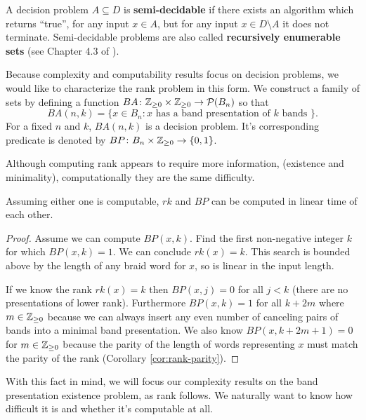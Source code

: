 \documentclass[12pt]{thesis}
\begin{document}
\begin{definition}
    A decision problem $A \subseteq D$ is \textbf{semi-decidable} if there exists an algorithm
    which returns ``true'', for any input $x \in A$,
    but for any input $x \in D \setminus A$ it does not terminate.
    Semi-decidable problems are also called \textbf{recursively enumerable sets}
    (see Chapter 4.3 of \cite{logical-foundations-of-math}).
\end{definition}

Because complexity and computability results focus on decision problems,
we would like to characterize the rank problem in this form.
We construct a family of sets 
by defining a function
$BA \colon \mathbb{Z}_{\geq 0} \times \mathbb{Z}_{\geq 0} \rightarrow \mathcal{P}(B_{n})$ 
so that 
\begin{equation} 
    BA(n, k) = \{ x \in B_{n} \colon x \text{ has a band presentation of $k$ bands } \}.
\end{equation}
For a fixed $n$ and $k$,  $BA(n, k)$ is a decision problem.
It's corresponding predicate is denoted by $BP \colon B_{n} \times \mathbb{Z}_{\geq 0} \rightarrow \{ 0, 1 \}$.


Although computing rank appears to require more information,
(existence and minimality), computationally they are the same difficulty.
\begin{proposition}
    Assuming either one is computable, $rk$ and $BP$ can be computed in linear time of each other.
\end{proposition}
\begin{proof}
    Assume we can compute $BP(x, k)$.
    Find the first non-negative integer $k$ for which $BP(x, k) = 1$.
    We can conclude $rk(x) = k$.
    This search is bounded above by the length of any braid word for $x$, so is linear in the input length.

    If we know the rank $rk(x) = k$
    then $BP(x, j) = 0$ for all $j < k$ (there are no presentations of lower rank).
    Furthermore $BP(x, k) = 1$ for all $k + 2m$ where $m \in \mathbb{Z}_{\geq 0}$
    because we can always insert any even number of canceling pairs of bands into 
    a minimal band presentation.
    We also know $BP(x, k + 2m + 1) = 0$ for $m \in \mathbb{Z}_{\geq 0}$ because
    the parity of the length of words representing $x$ must
    match the parity of the rank (Corollary \ref{cor:rank-parity}).
\end{proof}

With this fact in mind, we will focus our complexity results on the band presentation existence problem,
as rank follows.
We naturally want to know how difficult it is and whether it's computable at all.
\end{document}
